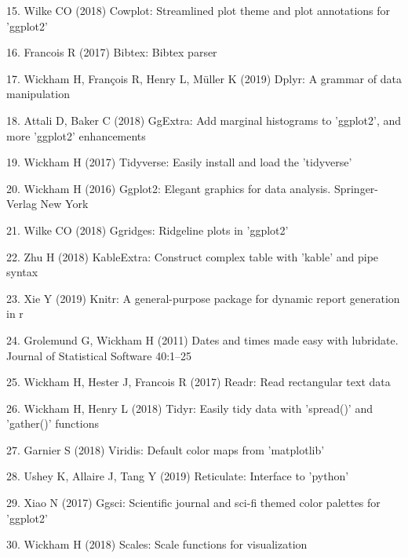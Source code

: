 \documentclass[11pt,]{article}
\begin{document}
\leavevmode\hypertarget{ref-cowplot}{}%
15. Wilke CO (2018) Cowplot: Streamlined plot theme and plot annotations
for 'ggplot2'

\leavevmode\hypertarget{ref-bibtex}{}%
16. Francois R (2017) Bibtex: Bibtex parser

\leavevmode\hypertarget{ref-dplyr}{}%
17. Wickham H, François R, Henry L, Müller K (2019) Dplyr: A grammar of
data manipulation

\leavevmode\hypertarget{ref-ggExtra}{}%
18. Attali D, Baker C (2018) GgExtra: Add marginal histograms to
'ggplot2', and more 'ggplot2' enhancements

\leavevmode\hypertarget{ref-tidyverse}{}%
19. Wickham H (2017) Tidyverse: Easily install and load the 'tidyverse'

\leavevmode\hypertarget{ref-ggplot2}{}%
20. Wickham H (2016) Ggplot2: Elegant graphics for data analysis.
Springer-Verlag New York

\leavevmode\hypertarget{ref-ggridges}{}%
21. Wilke CO (2018) Ggridges: Ridgeline plots in 'ggplot2'

\leavevmode\hypertarget{ref-kableExtra}{}%
22. Zhu H (2018) KableExtra: Construct complex table with 'kable' and
pipe syntax

\leavevmode\hypertarget{ref-knitr1}{}%
23. Xie Y (2019) Knitr: A general-purpose package for dynamic report
generation in r

\leavevmode\hypertarget{ref-lubridate}{}%
24. Grolemund G, Wickham H (2011) Dates and times made easy with
lubridate. Journal of Statistical Software 40:1--25

\leavevmode\hypertarget{ref-readr}{}%
25. Wickham H, Hester J, Francois R (2017) Readr: Read rectangular text
data

\leavevmode\hypertarget{ref-tidyr}{}%
26. Wickham H, Henry L (2018) Tidyr: Easily tidy data with 'spread()'
and 'gather()' functions

\leavevmode\hypertarget{ref-viridis}{}%
27. Garnier S (2018) Viridis: Default color maps from 'matplotlib'

\leavevmode\hypertarget{ref-reticulate}{}%
28. Ushey K, Allaire J, Tang Y (2019) Reticulate: Interface to 'python'

\leavevmode\hypertarget{ref-ggsci}{}%
29. Xiao N (2017) Ggsci: Scientific journal and sci-fi themed color
palettes for 'ggplot2'

\leavevmode\hypertarget{ref-scales}{}%
30. Wickham H (2018) Scales: Scale functions for visualization
\end{document}
